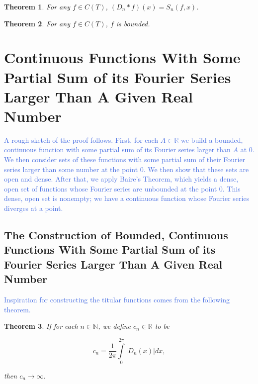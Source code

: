 \documentclass{amsart}
\newcommand{\N}{\mathbb{N}}
\newcommand{\R}{\mathbb{R}}
\newcommand{\colorcomment}[2]{\textcolor{#1}{#2}} %
\newcommand{\absval}[1]{\lvert #1 \rvert}
\newtheorem{thm}{Theorem}[section]
\theoremstyle{definition}
\begin{document}
\begin{thm}
For any $f \in C(T)$, $(D_n \ast f)(x) = S_n(f,x)$. 
\end{thm}

\begin{thm}
For any $f \in C(T)$, $f$ is bounded.
\end{thm}

\section{Continuous Functions With Some Partial Sum of its Fourier Series Larger Than A Given Real Number}

\colorcomment{RoyalBlue}{A rough sketch of the proof follows. 
First, for each $A \in \R$ we build a bounded, continuous function with some partial sum of its Fourier series larger than $A$ at $0$. 
We then consider sets of these functions with some partial sum of their Fourier series larger than some number at the point $0$.
We then show that these sets are open and dense. 
After that, we apply Baire's Theorem, which yields a dense, open set of functions whose Fourier series are unbounded at the point $0$. 
This dense, open set is nonempty; we have a continuous function whose Fourier series diverges at a point.}

\subsection{The Construction of Bounded, Continuous Functions With Some Partial Sum of its Fourier Series Larger Than A Given Real Number}

\colorcomment{RoyalBlue}{Inspiration for constructing the titular functions comes from the following theorem.}

\begin{thm}
If for each $n \in \N$, we define $c_n \in \R$ to be

\begin{displaymath}
c_n = \frac{1}{2 \pi} \int\limits_0^{2\pi} \absval{D_n(x)} dx,
\end{displaymath}

then $c_n \to \infty$.
\end{thm}
\end{document}
